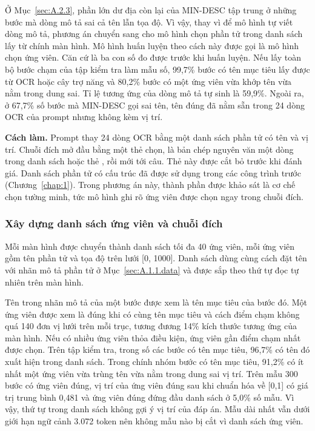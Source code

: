 Ở Mục~\ref{sec:A.2.3}, phần lớn dư địa còn lại của MIN-DESC tập trung ở những bước mà dòng mô tả sai cả tên lẫn tọa độ. Vì vậy, thay vì để mô hình tự viết dòng mô tả, phương án chuyển sang cho mô hình chọn phần tử trong danh sách lấy từ chính màn hình. Mô hình huấn luyện theo cách này được gọi là mô hình chọn ứng viên. Căn cứ là ba con số đo được trước khi huấn luyện. Nếu lấy toàn bộ bước chạm của tập kiểm tra làm mẫu số, 99,7\% bước có tên mục tiêu lấy được từ OCR hoặc cây trợ năng và 80,2\% bước có một ứng viên vừa khớp tên vừa nằm trong dung sai. Tỉ lệ tương ứng của dòng mô tả tự sinh là 59,9\%. Ngoài ra, ở 67,7\% số bước mà MIN-DESC gọi sai tên, tên đúng đã nằm sẵn trong 24 dòng OCR của prompt nhưng không kèm vị trí.

\textbf{Cách làm.} Prompt thay 24 dòng OCR bằng một danh sách phần tử có tên và vị trí. Chuỗi đích mở đầu bằng một thẻ chọn, là bản chép nguyên văn một dòng trong danh sách hoặc thẻ , rồi mới tới câu. Thẻ này được cắt bỏ trước khi đánh giá. Danh sách phần tử có cấu trúc đã được sử dụng trong các công trình trước (Chương~\ref{chap:1}). Trong phương án này, thành phần được khảo sát là cơ chế chọn tường minh, tức mô hình ghi rõ ứng viên được chọn ngay trong chuỗi đích.

\subsubsection{Xây dựng danh sách ứng viên và chuỗi đích}\label{sec:A.3.1.data}

Mỗi màn hình được chuyển thành danh sách tối đa 40 ứng viên, mỗi ứng viên gồm tên phần tử và tọa độ trên lưới [0, 1000]. Danh sách dùng cùng cách đặt tên với nhãn mô tả phần tử ở Mục~\ref{sec:A.1.1.data} và được sắp theo thứ tự đọc tự nhiên trên màn hình.

Tên trong nhãn mô tả của một bước được xem là tên mục tiêu của bước đó. Một ứng viên được xem là đúng khi có cùng tên mục tiêu và cách điểm chạm không quá 140 đơn vị lưới trên mỗi trục, tương đương 14\% kích thước tương ứng của màn hình. Nếu có nhiều ứng viên thỏa điều kiện, ứng viên gần điểm chạm nhất được chọn. Trên tập kiểm tra, trong số các bước có tên mục tiêu, 96,7\% có tên đó xuất hiện trong danh sách. Trong chính nhóm bước có tên mục tiêu, 91,2\% có ít nhất một ứng viên vừa trùng tên vừa nằm trong dung sai vị trí. Trên mẫu 300 bước có ứng viên đúng, vị trí của ứng viên đúng sau khi chuẩn hóa về [0,1] có giá trị trung bình 0,481 và ứng viên đúng đứng đầu danh sách ở 5,0\% số mẫu. Vì vậy, thứ tự trong danh sách không gợi ý vị trí của đáp án. Mẫu dài nhất vẫn dưới giới hạn ngữ cảnh 3.072 token nên không mẫu nào bị cắt vì danh sách ứng viên.

